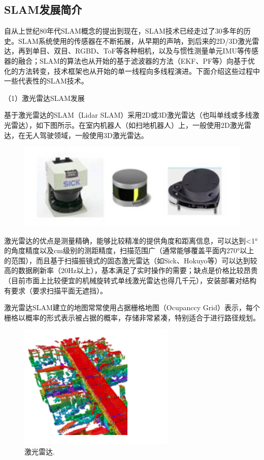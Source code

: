 \subsection{SLAM发展简介}
自从上世纪80年代SLAM概念的提出到现在，SLAM技术已经走过了30多年的历史。SLAM系统使用的传感器在不断拓展，从早期的声呐，到后来的2D/3D激光雷达，再到单目、双目、RGBD、ToF等各种相机，以及与惯性测量单元IMU等传感器的融合；SLAM的算法也从开始的基于滤波器的方法（EKF、PF等）向基于优化的方法转变，技术框架也从开始的单一线程向多线程演进。下面介绍这些过程中一些代表性的SLAM技术。

（1）激光雷达SLAM发展

基于激光雷达的SLAM（Lidar SLAM）采用2D或3D激光雷达（也叫单线或多线激光雷达），如下图所示。在室内机器人（如扫地机器人）上，一般使用2D激光雷达，在无人驾驶领域，一般使用3D激光雷达。


\begin{figure}[h]%
	\centering  %
	\includegraphics[width=0.7\linewidth]{image/Talk/2.png}  %

\end{figure}


激光雷达的优点是测量精确，能够比较精准的提供角度和距离信息，可以达到<1°的角度精度以及cm级别的测距精度，扫描范围广（通常能够覆盖平面内270°以上的范围），而且基于扫描振镜式的固态激光雷达（如Sick、Hokuyo等）可以达到较高的数据刷新率（20Hz以上），基本满足了实时操作的需要；缺点是价格比较昂贵（目前市面上比较便宜的机械旋转式单线激光雷达也得几千元），安装部署对结构有要求（要求扫描平面无遮挡）。

激光雷达SLAM建立的地图常常使用占据栅格地图（Ocupanccy Grid）表示，每个栅格以概率的形式表示被占据的概率，存储非常紧凑，特别适合于进行路径规划。

\begin{figure}[h]%
	\centering  %
	\includegraphics[width=0.7\linewidth]{image/Talk/3.png}  %
	\caption{激光雷达.}  %
\end{figure}


